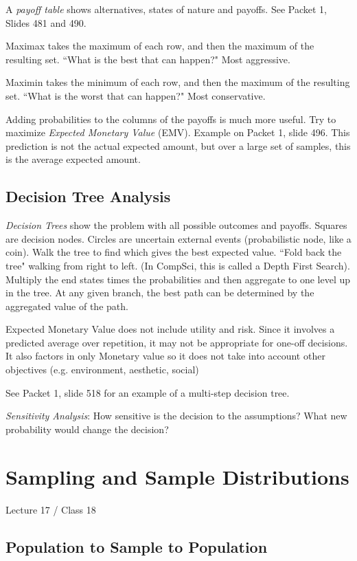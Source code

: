 \documentclass[11pt, oneside]{article}   	%
\begin{document}
A \textit{payoff table} shows alternatives, states of nature and payoffs. See Packet 1, Slides 481 and 490. 

Maximax takes the maximum of each row, and then the maximum of the resulting set. ``What is the best that can happen?" Most aggressive.

Maximin takes the minimum of each row, and then the maximum of the resulting set. ``What is the worst that can happen?" Most conservative.

Adding probabilities to the columns of the payoffs is much more useful. Try to maximize \textit{Expected Monetary Value} (EMV). Example on Packet 1, slide 496. This prediction is not the actual expected amount, but over a large set of samples, this is the average expected amount. 

\subsection{Decision Tree Analysis}

\textit{Decision Trees} show the problem with all possible outcomes and payoffs. Squares are decision nodes. Circles are uncertain external events (probabilistic node, like a coin). Walk the tree to find which gives the best expected value. ``Fold back the tree" walking from right to left. (In CompSci, this is called a Depth First Search). Multiply the end states times the probabilities and then aggregate to one level up in the tree. At any given branch, the best path can be determined by the aggregated value of the path.

Expected Monetary Value does not include utility and risk. Since it involves a predicted average over repetition, it may not be appropriate for one-off decisions. It also factors in only Monetary value so it does not take into account other objectives (e.g. environment, aesthetic, social)

See Packet 1, slide 518 for an example of a multi-step decision tree.

\textit{Sensitivity Analysis}: How sensitive is the decision to the assumptions? What new probability would change the decision?


\section{Sampling and Sample Distributions}
Lecture 17 / Class 18

\subsection{Population to Sample to Population}
\end{document}
